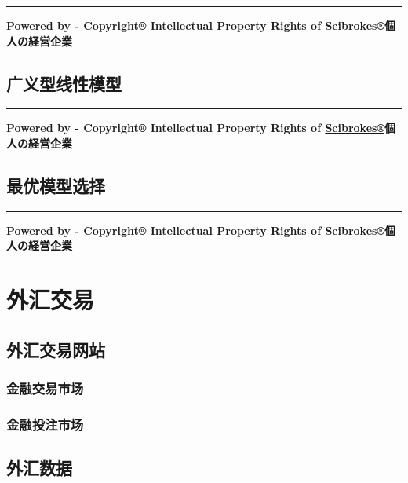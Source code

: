 \documentclass[]{book}
\theoremstyle{definition}
\theoremstyle{definition}
\theoremstyle{definition}
\theoremstyle{remark}
\begin{document}
\begin{center}\rule{0.5\linewidth}{\linethickness}\end{center}

\textbf{Powered by - Copyright® Intellectual Property Rights of
\href{http://www.scibrokes.com}{Scibrokes®}個人の経営企業}

\section{广义型线性模型}

\begin{center}\rule{0.5\linewidth}{\linethickness}\end{center}

\textbf{Powered by - Copyright® Intellectual Property Rights of
\href{http://www.scibrokes.com}{Scibrokes®}個人の経営企業}

\section{最优模型选择}

\begin{center}\rule{0.5\linewidth}{\linethickness}\end{center}

\textbf{Powered by - Copyright® Intellectual Property Rights of
\href{http://www.scibrokes.com}{Scibrokes®}個人の経営企業}

\hypertarget{finance}{%
\chapter{外汇交易}\label{finance}}

\section{外汇交易网站}

\subsection{金融交易市场}

\subsection{金融投注市场}

\section{外汇数据}
\end{document}

